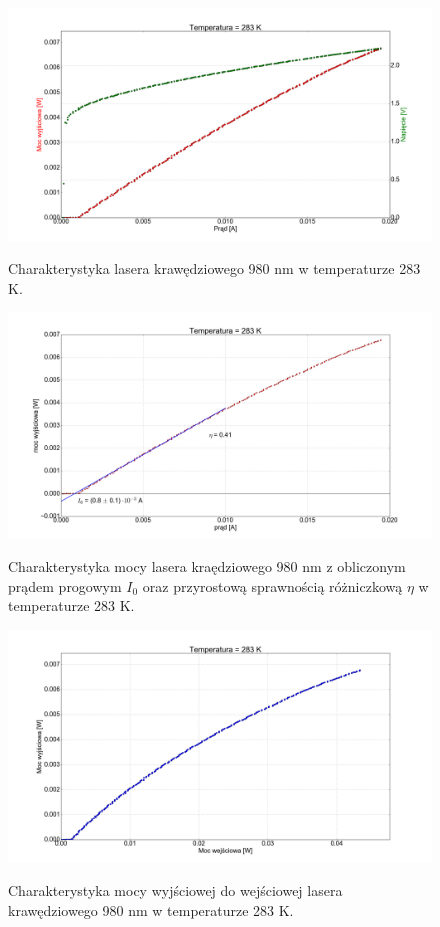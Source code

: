 \documentclass[a4paper, portrait,12pt]{report}
\begin{document}
\newpage
\begin{figure}
\center
  \includegraphics[scale=0.30]{plot980/temp_10_IVL.png}
  \label{rys1}
  \caption{Charakterystyka lasera krawędziowego 980 nm w temperaturze 283 K.} 
\end{figure}

\begin{figure}
\center
  \includegraphics[scale=0.30]{plot980/temp_10_fit.png}
  \label{rys1}
  \caption{Charakterystyka mocy lasera kraędziowego 980 nm z obliczonym prądem progowym $I_0$ oraz przyrostową sprawnością różniczkową $\eta$ w temperaturze 283 K.} 
\end{figure}


\begin{figure}
\center
  \includegraphics[scale=0.30]{plot980/temp_10_power.png}
  \label{rys1}
  \caption{Charakterystyka mocy wyjściowej do wejściowej lasera krawędziowego 980 nm w temperaturze 283 K.} 
\end{figure}
\end{document}

